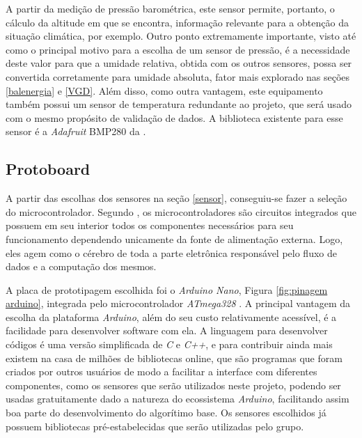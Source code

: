 \documentclass[acronym,symbols,table]{fei}
\begin{document}
A partir da medição de pressão barométrica, este sensor permite, portanto, o cálculo da altitude em que se encontra, informação relevante para a obtenção da situação climática, por exemplo. Outro ponto extremamente importante, visto até como o principal motivo para a escolha de um sensor de pressão, é a necessidade deste valor para que a umidade relativa, obtida com os outros sensores, possa ser convertida corretamente para umidade absoluta, fator mais explorado nas seções \ref{balenergia} e \ref{VGD}. Além disso, como outra vantagem, este equipamento também possui um sensor de temperatura redundante ao projeto, que será usado com o mesmo propósito de validação de dados. A biblioteca existente para esse sensor é a \textit{Adafruit} BMP280 da \textcite{Adafruit_BMP280}. 

\subsection{Protoboard} \label {Proto}

A partir das escolhas dos sensores na seção \ref{sensor}, conseguiu-se fazer a seleção do microcontrolador. Segundo \textcite{kerschbaumer2013microcontroladores}, os microcontroladores são circuitos integrados que possuem em seu interior todos os componentes necessários para seu funcionamento dependendo unicamente da fonte de alimentação externa. Logo, eles agem como o cérebro de toda a parte eletrônica responsável pelo fluxo de dados e a computação dos mesmos.

A placa de prototipagem escolhida foi o \textit{Arduino Nano}, Figura \ref{fig:pinagem arduino}, integrada pelo microcontrolador \textit{ATmega328} \cite{UNO}. A principal vantagem da escolha da plataforma \textit{Arduino}, além do seu custo relativamente acessível, é a facilidade para desenvolver software com ela. A linguagem para desenvolver códigos é uma versão simplificada de \textit{C} e \textit{C++}, e para contribuir ainda mais existem na casa de milhões de bibliotecas online, que são programas que foram criados por outros usuários de modo a facilitar a interface com diferentes componentes, como os sensores que serão utilizados neste projeto, podendo ser usadas gratuitamente dado a natureza do ecossistema \textit{Arduino}, facilitando assim boa parte do desenvolvimento do algorítimo base. Os sensores escolhidos já possuem bibliotecas pré-estabelecidas que serão utilizadas pelo grupo.
\end{document}
